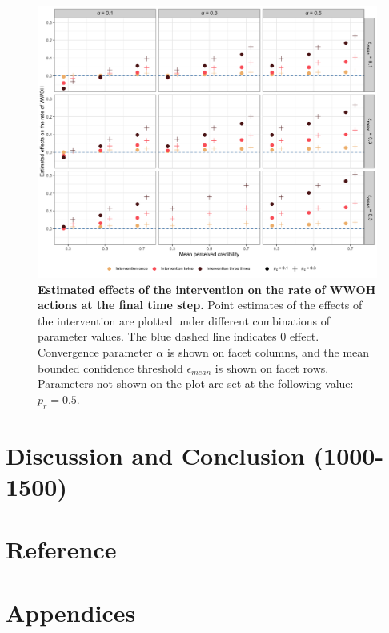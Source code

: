 \documentclass[
  11pt,
]{article}
\begin{document}
\begin{figure}[h]
  \centering
  \includegraphics[width=1\columnwidth]{./figures/intervention_effect_p_wwoh.png}
  \caption{\textbf{Estimated effects of the intervention on the rate of WWOH actions at the final time step.} Point estimates of the effects of the intervention are plotted under different combinations of parameter values. The blue dashed line indicates 0 effect. Convergence parameter $\alpha$ is shown on facet columns, and the mean bounded confidence threshold $\epsilon_{mean}$ is shown on facet rows. Parameters not shown on the plot are set at the following value: $p_r = 0.5$.}
  \label{fig:4}
\end{figure}

\hypertarget{discussion-and-conclusion-1000-1500}{%
\section{Discussion and Conclusion
(1000-1500)}\label{discussion-and-conclusion-1000-1500}}

\newpage

\hypertarget{reference}{%
\section*{Reference}\label{reference}}

\newpage

\hypertarget{appendices}{%
\section*{Appendices}\label{appendices}}
\end{document}
